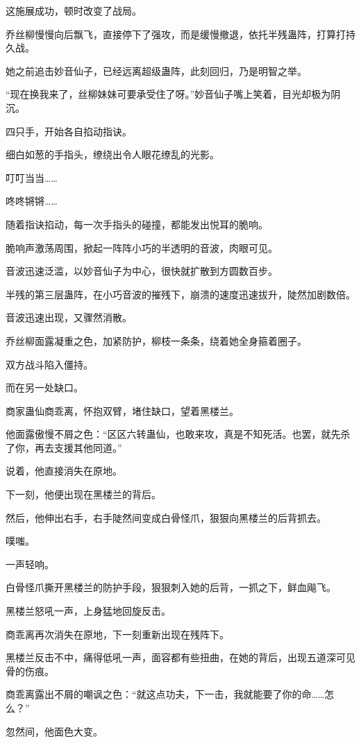 \begin{this_body}
这施展成功，顿时改变了战局。

乔丝柳慢慢向后飘飞，直接停下了强攻，而是缓慢撤退，依托半残蛊阵，打算打持久战。

她之前追击妙音仙子，已经远离超级蛊阵，此刻回归，乃是明智之举。

“现在换我来了，丝柳妹妹可要承受住了呀。”妙音仙子嘴上笑着，目光却极为阴沉。

四只手，开始各自掐动指诀。

细白如葱的手指头，缭绕出令人眼花缭乱的光影。

叮叮当当……

咚咚锵锵……

随着指诀掐动，每一次手指头的碰撞，都能发出悦耳的脆响。

脆响声激荡周围，掀起一阵阵小巧的半透明的音波，肉眼可见。

音波迅速泛滥，以妙音仙子为中心，很快就扩散到方圆数百步。

半残的第三层蛊阵，在小巧音波的摧残下，崩溃的速度迅速拔升，陡然加剧数倍。

音波迅速出现，又骤然消散。

乔丝柳面露凝重之色，加紧防护，柳枝一条条，绕着她全身箍着圈子。

双方战斗陷入僵持。

而在另一处缺口。

商家蛊仙商乖离，怀抱双臂，堵住缺口，望着黑楼兰。

他面露傲慢不屑之色：“区区六转蛊仙，也敢来攻，真是不知死活。也罢，就先杀了你，再去支援其他同道。”

说着，他直接消失在原地。

下一刻，他便出现在黑楼兰的背后。

然后，他伸出右手，右手陡然间变成白骨怪爪，狠狠向黑楼兰的后背抓去。

噗嗤。

一声轻响。

白骨怪爪撕开黑楼兰的防护手段，狠狠刺入她的后背，一抓之下，鲜血飚飞。

黑楼兰怒吼一声，上身猛地回旋反击。

商乖离再次消失在原地，下一刻重新出现在残阵下。

黑楼兰反击不中，痛得低吼一声，面容都有些扭曲，在她的背后，出现五道深可见骨的伤痕。

商乖离露出不屑的嘲讽之色：“就这点功夫，下一击，我就能要了你的命……怎么？”

忽然间，他面色大变。


\end{this_body}
